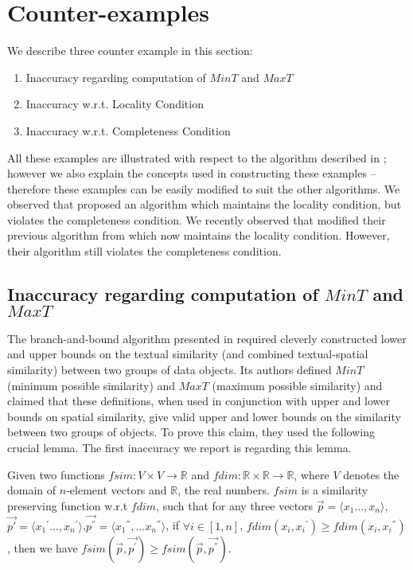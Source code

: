 \documentclass[prodmode,letterpaper]{acmsmall}
\begin{document}
\section{Counter-examples}\label{section:counter-ex}
We describe three counter example in this section:
\begin{enumerate}
    \item Inaccuracy regarding computation of $MinT$ and $MaxT$
    \item Inaccuracy w.r.t. Locality Condition
    \item Inaccuracy w.r.t. Completeness Condition
\end{enumerate}
All these examples are
illustrated with respect to the algorithm described in \cite{lu2011reverse};
however we also
explain the concepts used in constructing these examples -- therefore these
examples can be easily modified to suit the other algorithms.
We observed that \cite{achtert2009reverse} proposed an algorithm which maintains
the locality condition, but violates the completeness condition. We recently
observed that \cite{lu2014efficient} modified their previous algorithm from
\cite{lu2011reverse} which now maintains the locality condition. However, their algorithm still violates the completeness condition.

\subsection{Inaccuracy regarding computation of $MinT$ and $MaxT$}
The branch-and-bound algorithm presented in \cite{lu2011reverse} required
cleverly constructed lower and upper bounds on the textual similarity (and combined
textual-spatial similarity) between two groups of data objects. Its authors defined
$MinT$ (minimum possible similarity) and $MaxT$ (maximum possible similarity)
and claimed that these definitions, when used in conjunction with upper and
lower bounds on spatial similarity, give valid upper and lower bounds on the
similarity between two groups of objects. To prove this claim, they used the
following crucial lemma. The first inaccuracy we report is regarding this lemma.

\begin{definition} \cite{lu2011reverse} Given
    two functions $fsim: V \times V \rightarrow \mathbb{R}$ and $fdim:
    \mathbb{R} \times \mathbb{R} \rightarrow \mathbb{R}$, where $V$ denotes the
    domain of $n$-element vectors and $\mathbb{R}$, the real numbers. $fsim$ is
    a similarity preserving function w.r.t $fdim$, such that for any three vectors
    $\vec{p}= \langle x_1\ldots,x_n \rangle$, $\vec{p'} =\langle
    {x_1}^{'}\ldots,{x_n}^{'} \rangle$,$\vec{p^{''}}= \langle
    {x_1}^{''},\ldots{x_n}^{''} \rangle$, if $\forall i  \in [1,n]$,
    $fdim(x_i,{x_i}^{'}) \geq fdim(x_i,{x_i}^{''})$, then we have $fsim(\vec{p},\vec{p^{'}})\geq fsim(\vec{p},\vec{{p}^{''}})$.
\label{defn:similarity_PF}
\end{definition}
\end{document}
